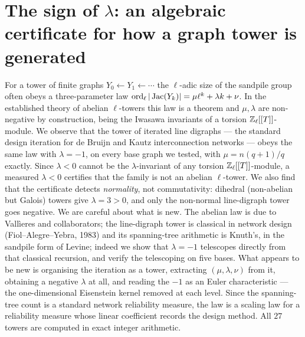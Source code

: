\chapter[\texorpdfstring{The sign of $\lambda$: an algebraic certificate for how a graph tower is generated}{The sign of lambda: an algebraic certificate for how a graph tower is generated}]{\texorpdfstring{The sign of $\lambda$: an algebraic certificate for how a graph tower is generated}{The sign of lambda: an algebraic certificate for how a graph tower is generated}}\label{chap:Net1}
\begin{chapterabstract}
\noindent
For a tower of finite graphs $Y_0\leftarrow Y_1\leftarrow\cdots$ the $\ell$-adic size of
the sandpile group often obeys a three-parameter law
$\operatorname{ord}_\ell|\operatorname{Jac}(Y_k)|=\mu\ell^{k}+\lambda k+\nu$. In the established theory of abelian
$\ell$-towers this law is a theorem and $\mu,\lambda$ are non-negative by construction,
being the Iwasawa invariants of a torsion $\mathbb{Z}_\ell[[T]]$-module. We observe that the tower of
iterated line digraphs --- the standard design iteration for de Bruijn and Kautz
interconnection networks --- obeys the same law with $\lambda=-1$, on every base graph we
tested, with $\mu=n(q{+}1)/q$ exactly. Since $\lambda<0$ cannot be the $\lambda$-invariant
of any torsion $\mathbb{Z}_\ell[[T]]$-module, a measured $\lambda<0$ certifies that the family is not an
abelian $\ell$-tower. We also find that the certificate detects \emph{normality}, not
commutativity: dihedral (non-abelian but Galois) towers give $\lambda=3>0$, and only the
non-normal line-digraph tower goes negative. We are careful about what is new. The abelian
law is due to Vall\`ieres and collaborators; the line-digraph tower is classical in network
design (Fiol--Alegre--Yebra, 1983) and its spanning-tree arithmetic is Knuth's, in the
sandpile form of Levine; indeed we show that $\lambda=-1$ telescopes directly from that
classical recursion, and verify the telescoping on five bases. What appears to be new is
organising the iteration as a tower, extracting $(\mu,\lambda,\nu)$ from it, obtaining a
negative $\lambda$ at all, and reading the $-1$ as an Euler characteristic --- the
one-dimensional Eisenstein kernel removed at each level. Since the spanning-tree count is a
standard network reliability measure, the law is a scaling law for a reliability measure
whose linear coefficient records the design method. All $27$ towers are computed in exact
integer arithmetic.
\end{chapterabstract}

